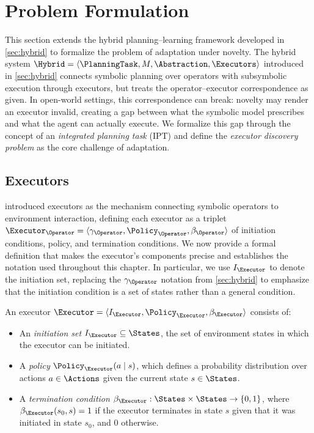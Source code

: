 \section{Problem Formulation}
\label{sec:ipt}

This section extends the hybrid planning--learning framework developed in \cref{sec:hybrid} to formalize the problem of adaptation under novelty. The hybrid system $\Hybrid = \langle \PlanningTask, M, \Abstraction, \Executors \rangle$ introduced in \cref{sec:hybrid} connects symbolic planning over operators with subsymbolic execution through executors, but treats the operator--executor correspondence as given. In open-world settings, this correspondence can break: novelty may render an executor invalid, creating a gap between what the symbolic model prescribes and what the agent can actually execute. We formalize this gap through the concept of an \emph{integrated planning task} (IPT) and define the \emph{executor discovery problem} as the core challenge of adaptation.


\subsection{Executors}
\label{sec:executors}

 introduced executors as the mechanism connecting symbolic operators to environment interaction, defining each executor as a triplet $\Executor_\Operator = \langle \gamma_\Operator, \Policy_\Operator, \beta_\Operator \rangle$ of initiation conditions, policy, and termination conditions. We now provide a formal definition that makes the executor's components precise and establishes the notation used throughout this chapter. In particular, we use $I_\Executor$ to denote the initiation set, replacing the $\gamma_\Operator$ notation from \cref{sec:hybrid} to emphasize that the initiation condition is a set of states rather than a general condition.

\begin{definition}[Executor]
\label{def:executor}
An executor $\Executor = \langle I_{\Executor}, \Policy_{\Executor}, \beta_{\Executor} \rangle$ consists of:
\begin{itemize}[leftmargin=*]
    \item An \emph{initiation set} $I_{\Executor} \subseteq \States$, the set of environment states in which the executor can be initiated.
    \item A \emph{policy} $\Policy_{\Executor}(a \mid s)$, which defines a probability distribution over actions $a \in \Actions$ given the current state $s \in \States$.
    \item A \emph{termination condition} $\beta_{\Executor} : \States \times \States \rightarrow \{0, 1\}$, where $\beta_{\Executor}(s_0, s) = 1$ if the executor terminates in state $s$ given that it was initiated in state $s_0$, and $0$ otherwise.
\end{itemize}
\end{definition}

